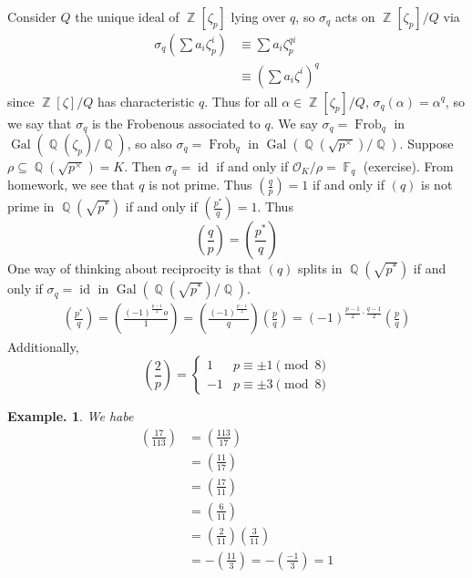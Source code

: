 \documentclass[11pt, a4paper]{memoir}
\DeclareMathOperator{\Q}{{\mathbb{Q}}}
\DeclareMathOperator{\Z}{{\mathbb{Z}}}
\DeclareMathOperator{\F}{{\mathbb{F}}}
\theoremstyle{change}
\theoremstyle{plain}
\theoremstyle{nonumberplain}
\newtheorem{example}{Example.}
\DeclareMathOperator{\Gal}{Gal}
\DeclareMathOperator{\id}{id}
\newcommand{\lgs}[2]{\ensuremath{\left(\frac{#1}{#2}\right)}}
\DeclareMathOperator{\Frob}{Frob}
\numberwithin{equation}{section}
\begin{document}
Consider $Q$ the unique ideal of $\Z[\zeta_p]$ lying over $q$, so $\sigma_q$ acts on $\Z[\zeta_p]/Q$ via
\begin{align*}
    \sigma_q\left(\sum a_i\zeta_p^i\right)&\equiv\sum a_i\zeta_p^{qi}\\
                                          &\equiv \left(\sum a_i\zeta^i\right)^q
\end{align*}
since $\Z[\zeta]/Q$ has characteristic $q$.
Thus for all $\alpha\in\Z[\zeta_p]/Q$, $\sigma_q(\alpha)=\alpha^q$, so we say that $\sigma_q$ is the Frobenous associated to $q$.
We say $\sigma_q=\Frob_q$ in $\Gal(\Q(\zeta_p)/\Q)$, so also $\sigma_q=\Frob_q$ in $\Gal(\Q(\sqrt{p^\times})/\Q)$.
Suppose $\rho\subseteq\Q(\sqrt{p^\times})=K$.
Then $\sigma_q=\id$ if and only if $\mathcal{O}_K/\rho=\F_q$ (exercise).
From homework, we see that $q$ is not prime.
Thus
$\lgs{q}{p}=1$ if and only if $(q)$ is not prime in $\Q(\sqrt{p^*})$ if and only if $\lgs{p^*}{q}=1$.
Thus
\begin{equation*}
    \lgs{q}{p}=\lgs{p^*}{q}
\end{equation*}
One way of thinking about reciprocity is that $(q)$ splits in $\Q(\sqrt{p^*})$ if and only if $\sigma_q=\id$ in $\Gal(\Q(\sqrt{p^*})/\Q)$.
\begin{align*}
    \lgs{p^*}{q}=\lgs{(-1)^{\frac{p-1}{2}}o}{1}=\lgs{(-1)^{\frac{p-1}{2}}}{q}\lgs{p}{q}=(-1)^{\frac{p-1}{2}\cdot\frac{q-1}{2}}\lgs{p}{q}
\end{align*}
Additionally,
\begin{equation*}
    \lgs{2}{p}=
    \begin{cases}
        1 &p\equiv \pm1\pmod{8}\\
        -1&p\equiv \pm3\pmod{8}
    \end{cases}
\end{equation*}
\begin{example}
    We habe
    \begin{align*}
        \lgs{17}{113} &= \lgs{113}{17}\\
                      &= \lgs{11}{17}\\
                      &= \lgs{17}{11}\\
                      &=\lgs{6}{11}\\
                      &= \lgs{2}{11}\lgs{3}{11}\\
                      &= -\lgs{11}{3}=-\lgs{-1}{3}=1
    \end{align*}
\end{example}
\end{document}
